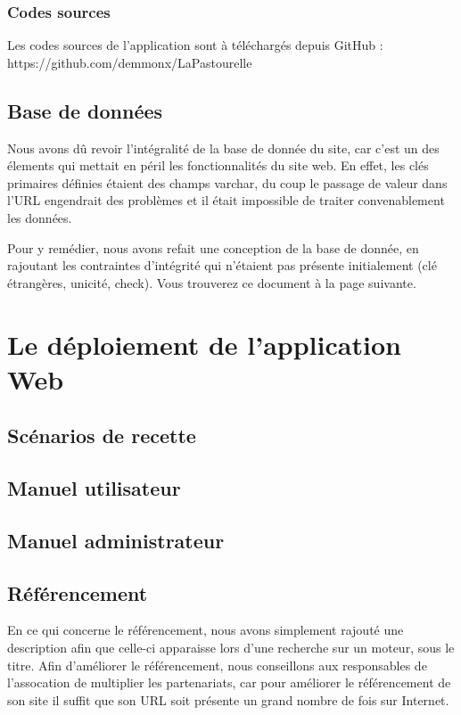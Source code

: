 \documentclass[11pt]{report}
\begin{document}
 \subsection{Codes sources}
 Les codes sources de l'application sont à téléchargés depuis GitHub :
 https://github.com/demmonx/LaPastourelle

\section{Base de données}
Nous avons dû revoir l'intégralité de la base de donnée du site, car c'est un
des élements qui mettait en péril les fonctionnalités du site web. En effet, les
clés primaires définies étaient des champs varchar, du coup le passage de valeur
dans l'URL engendrait des problèmes et il était impossible de traiter
convenablement les données. \\

\par Pour y remédier, nous avons refait une conception de la base de donnée, en
rajoutant les contraintes d'intégrité qui n'étaient pas présente initialement
(clé étrangères, unicité, check). Vous trouverez ce document à la page suivante.


\chapter{Le déploiement de l'application Web}
\section{Scénarios de recette}
\section{Manuel utilisateur}
\section{Manuel administrateur}
\section{Référencement}
En ce qui concerne le référencement, nous avons simplement rajouté une
description afin que celle-ci apparaisse lors d'une recherche sur un moteur,
sous le titre. Afin d'améliorer le référencement, nous conseillons aux
responsables de l'assocation de multiplier les partenariats, car pour améliorer
le référencement de son site il suffit que son URL soit présente un grand nombre
de fois sur Internet.
\end{document}
